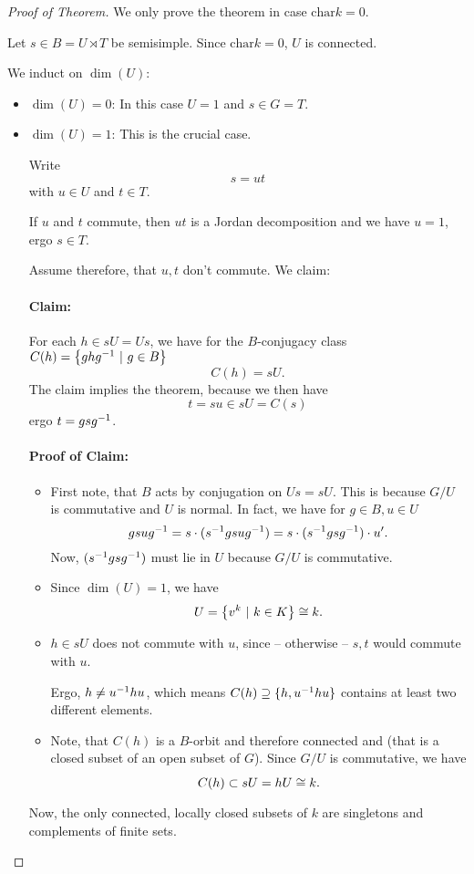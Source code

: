 \begin{proof}[Proof of Theorem]
	We only prove the theorem in case $\mathrm{char} k = 0$.
	
	Let $s \in B = U\rtimes T$ be semisimple. Since $\mathrm{char} k = 0$, $U$ is connected.
	
	We induct on $\dim(U)$:
	\begin{itemize}
		\item $\dim(U) = 0$: In this case $U = 1$ and $s \in G= T$.
		\item $\dim(U) = 1$: This is the crucial case.
		
		Write
		\[ s=ut \]
		with $u \in U$ and $t \in T$.
		
		If $u$ and $t$ commute, then $ut$ is a Jordan decomposition and we have $u = 1$, ergo $s \in T$.
		
		Assume therefore, that $u,t$ don't commute. We claim:
		
		\paragraph{Claim:} For each $h \in sU = Us$, we have for the $B$-conjugacy class $C(h) = \left\lbrace ghg^{-1} ~ | ~ g \in B\right\rbrace$
		\[ C(h) = sU. \]
		The claim implies the theorem, because we then have
		\[ t = su \in sU = C(s) \]
		ergo $t = gsg^{-1}$.
		
		\paragraph{Proof of Claim:}	
		\begin{itemize}
			\item First note, that $B$ acts by conjugation on $Us = sU$. This is because $G/U$ is commutative and $U$ is normal. In fact, we have for $g \in B, u \in U$
			\[ gsug^{-1} = s \cdot (s^{-1} g sug^{-1}) = s \cdot (s^{-1} g s g^{-1}) \cdot u'. \]
			Now, $(s^{-1} g s g^{-1})$ must lie in $U$ because $G/U$ is commutative.
			\item Since $\dim(U) = 1$, we have 
			\[ U = \left\lbrace v^k ~ | ~ k \in K\right\rbrace \overset{}{\cong} k. \]
			\item $h \in sU$ does not commute with $u$, since -- otherwise -- $s,t$ would commute with $u$.
			
			Ergo, $h \neq u^{-1} h u$, which means $C(h) \supseteq \{h, u^{-1} h u\}$ contains at least two different elements.
			\item Note, that $C(h)$ is a $B$-orbit and therefore connected and  (that is a closed subset of an open subset of $G$). Since $G/U$ is commutative, we have
			\[ C(h) \subset sU = hU \overset{}{\cong} k. \]
		\end{itemize}	
		Now, the only connected, locally closed subsets of $k$ are singletons and complements of finite sets.
		

\end{itemize}
\end{proof}
